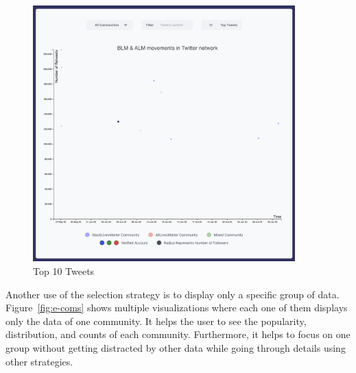 \begin{figure}[H]
\centering
\captionsetup{justification=centering}
\includegraphics[width=0.9\textwidth]{Report-latex/tex_files/pics/example/top10.png}
\caption{Top 10 Tweets}
\label{fig:top-10}
\end{figure}


Another use of the selection strategy is to display only a specific group of data. Figure~\ref{fig:e-coms} shows multiple visualizations where each one of them displays only the data of one community. It helps the user to see the popularity, distribution, and counts of each community. Furthermore, it helps to focus on one group without getting distracted by other data while going through details using other strategies. 

